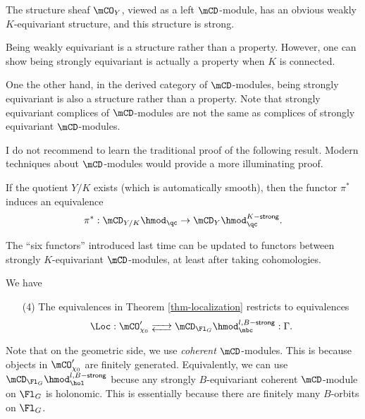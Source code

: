 	\begin{exam}
		The structure sheaf $\mCO_Y$, viewed as a left $\mCD$-module, has an obvious weakly $K$-equivariant structure, and this structure is strong.
	\end{exam}

	\begin{rem}
		Being weakly equivariant is a structure rather than a property. However, one can show being strongly equivariant is actually a property when $K$ is connected.

		One the other hand, in the derived category of $\mCD$-modules, being strongly equivariant is also a structure rather than a property. Note that strongly equivariant complices of $\mCD$-modules are not the same as complices of strongly equivariant $\mCD$-modules.
	\end{rem}

	I do not recommend to learn the traditional proof of the following result. Modern techniques about $\mCD$-modules would provide a more illuminating proof.

	\begin{prop}
		If the quotient $Y/K$ exists (which is automatically smooth), then the functor $\pi^*$ induces an equivalence
		\[
			\pi^*: \mCD_{Y/K}\hmod_\qc \to \mCD_Y\hmod_\qc^{K-\mathsf{strong}}.
		\]

	\end{prop}

	\begin{exam}
		The ``six functors'' introduced last time can be updated to functors between strongly $K$-equivariant $\mCD$-modules, at least after taking cohomologies.
	\end{exam}

	\begin{thm}
		We have
		\begin{itemize}
			\item[(4)]
				The equivalences in Theorem \ref{thm-localization} restricts to equivalences
				\[
					\Loc: \mCO_{\chi_0}' \adj \mCD_{\Fl_G}\hmod_\mbc^{l,B-\mathsf{strong}} : \Gamma.
				\]
		\end{itemize}
		
	\end{thm}

	\begin{rem}
		Note that on the geometric side, we use \emph{coherent} $\mCD$-modules. This is because objects in $\mCO_{\chi_0}' $ are finitely generated. Equivalently, we can use $\mCD_{\Fl_G}\hmod_\hol^{l,B-\mathsf{strong}}$ becuse any strongly $B$-equivariant coherent $\mCD$-module on $\Fl_G$ is holonomic. This is essentially because there are finitely many $B$-orbits on $\Fl_G$.
	\end{rem}

